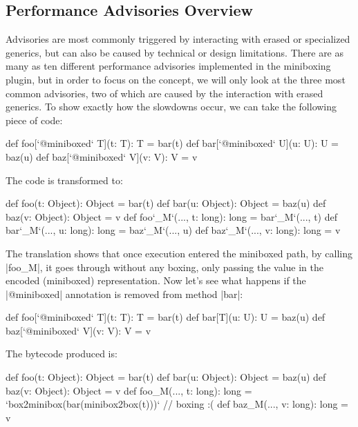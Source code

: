 \vspace{-0.8em}

\subsection{Performance Advisories Overview}

\vspace{-0.4em}

Advisories are most commonly triggered by interacting with erased or specialized generics, but can also be caused by technical or design limitations. There are as many as ten different performance advisories implemented in the miniboxing plugin, but in order to focus on the concept, we will only look at the three most common advisories, two of which are caused by the interaction with erased generics. To show exactly how the slowdowns occur, we can take the following piece of code:

\begin{lstlisting-nobreak}
 def foo[`@miniboxed` T](t: T): T = bar(t)
 def bar[`@miniboxed` U](u: U): U = baz(u)
 def baz[`@miniboxed` V](v: V): V = v
\end{lstlisting-nobreak}

The code is transformed to:

\begin{lstlisting-nobreak}
 def foo(t: Object): Object = bar(t)
 def bar(u: Object): Object = baz(u)
 def baz(v: Object): Object = v
 def foo`_M`(..., t: long): long = bar`_M`(..., t)
 def bar`_M`(..., u: long): long = baz`_M`(..., u)
 def baz`_M`(..., v: long): long = v
\end{lstlisting-nobreak}

The translation shows that once execution entered the miniboxed path, by calling |foo_M|, it goes through without any boxing, only passing the value in the encoded (miniboxed) representation. Now let's see what happens if the |@miniboxed| annotation is removed from method |bar|:

\begin{lstlisting-nobreak}
 def foo[`@miniboxed` T](t: T): T = bar(t)
 def bar[T](u: U): U = baz(u)
 def baz[`@miniboxed` V](v: V): V = v
\end{lstlisting-nobreak}

The bytecode produced is:

\begin{lstlisting-nobreak}
 def foo(t: Object): Object = bar(t)
 def bar(u: Object): Object = baz(u)
 def baz(v: Object): Object = v
 def foo_M(..., t: long): long = `box2minibox(bar(minibox2box(t)))` // boxing :(
 def baz_M(..., v: long): long = v
\end{lstlisting-nobreak}

